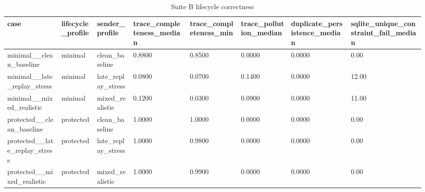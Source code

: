 \begin{table}[htbp]
\centering
\caption{Suite B lifecycle correctness}
\begin{tabular}{llllllll}
\hline
case & lifecycle\_profile & sender\_profile & trace\_completeness\_median & trace\_completeness\_min & trace\_pollution\_median & duplicate\_persistence\_median & sqlite\_unique\_constraint\_fail\_median \\
\hline
minimal\_\_clean\_baseline & minimal & clean\_baseline & 0.8800 & 0.8500 & 0.0000 & 0.0000 & 0.00 \\
minimal\_\_late\_replay\_stress & minimal & late\_replay\_stress & 0.0800 & 0.0700 & 0.1400 & 0.0000 & 12.00 \\
minimal\_\_mixed\_realistic & minimal & mixed\_realistic & 0.1200 & 0.0300 & 0.0900 & 0.0000 & 11.00 \\
protected\_\_clean\_baseline & protected & clean\_baseline & 1.0000 & 1.0000 & 0.0000 & 0.0000 & 0.00 \\
protected\_\_late\_replay\_stress & protected & late\_replay\_stress & 1.0000 & 0.9800 & 0.0000 & 0.0000 & 0.00 \\
protected\_\_mixed\_realistic & protected & mixed\_realistic & 1.0000 & 0.9900 & 0.0000 & 0.0000 & 0.00 \\
\hline
\end{tabular}
\end{table}
